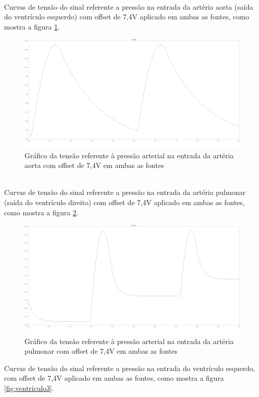 \documentclass{abntex2}
\begin{document}
\\Curvas de tensão do sinal referente a pressão na entrada da artéria aorta (saída do ventrículo esquerdo) com offset de 7,4V aplicado em ambas as fontes, como mostra a figura \ref{fig:aorta3}.
\pagebreak
\begin{figure}[h]
  \centering
  \includegraphics[scale = 0.3]{aorta_v174_v274.png}
  \caption{Gráfico da tensão referente à pressão arterial na entrada da artéria aorta com offset de 7,4V em ambas as fontes}
  \label{fig:aorta3}
\end{figure}

\\Curvas de tensão do sinal referente a pressão na entrada da artéria pulmonar (saída do ventrículo direito) com offset de 7,4V aplicado em ambas as fontes, como mostra a figura \ref{fig:pulmonar3}.

\begin{figure}[h]
  \centering
  \includegraphics[scale = 0.3]{pulmonar_v174_v274.png}
  \caption{Gráfico da tensão referente à pressão arterial na entrada da artéria pulmonar com offset de 7,4V em ambas as fontes}
  \label{fig:pulmonar3}
\end{figure}
\pagebreak
Curvas de tensão do sinal referente a pressão na entrada do ventrículo esquerdo, com offset de 7,4V aplicado em ambas as fontes, como mostra a figura \ref{fig:ventriculo3}.
\end{document}
